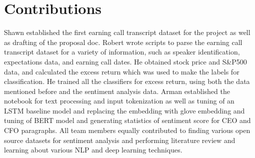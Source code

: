 \documentclass{article}
\newif\ifshowInstructions
\newcommand{\instructions}[1]{%
    \ifshowInstructions%
        \textcolor{violet}{#1}%
    \fi%
}
\begin{document}
\pagebreak

\section{Contributions}
Shawn established the first earning call transcript dataset for the project as well as drafting of the proposal doc. Robert wrote scripts to parse the earning call transcript dataset for a variety of information, such as speaker identification, expectations data, and earning call dates. He obtained stock price and S\&P500 data, and calculated the excess return which was used to make the labels for classification. He trained all the classifiers for excess return, using both the data mentioned before and the sentiment analysis data.
Arman established the notebook for text processing and input tokenization as well as tuning of an LSTM baseline model and replacing the embedding with glove embedding and tuning of BERT model and generating
statistics of sentiment score for CEO and CFO paragraphs. All team members equally contributed to finding various open source datasets for sentiment analysis and performing 
literature review and learning about various NLP and deep learning techniques.



%
%



\end{document}
